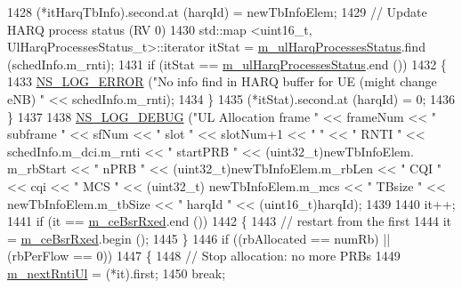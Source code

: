 \begin{DoxyCode}
1428                         (*itHarqTbInfo).second.at (harqId) = newTbInfoElem;
1429                         \textcolor{comment}{// Update HARQ process status (RV 0)}
1430                         std::map <uint16\_t, UlHarqProcessesStatus\_t>::iterator itStat = 
      \hyperlink{classns3_1_1MmWaveRrMacScheduler_af963cfe7e5dc36fce45c16d60b506465}{m\_ulHarqProcessesStatus}.find (schedInfo.m\_rnti);
1431                         \textcolor{keywordflow}{if} (itStat == \hyperlink{classns3_1_1MmWaveRrMacScheduler_af963cfe7e5dc36fce45c16d60b506465}{m\_ulHarqProcessesStatus}.end ())
1432                         \{
1433                                 \hyperlink{group__logging_ga0261a8db1d4ac5f79417d117634fd455}{NS\_LOG\_ERROR} (\textcolor{stringliteral}{"No info find in HARQ buffer for UE (might change
       eNB) "} << schedInfo.m\_rnti);
1434                         \}
1435                         (*itStat).second.at (harqId) = 0;
1436                 \}
1437 
1438                 \hyperlink{group__logging_ga413f1886406d49f59a6a0a89b77b4d0a}{NS\_LOG\_DEBUG} (\textcolor{stringliteral}{"UL Allocation frame "} << frameNum << \textcolor{stringliteral}{" subframe "} << sfNum << \textcolor{stringliteral}{"
       slot "} << slotNum+1 << \textcolor{stringliteral}{" "} << \textcolor{stringliteral}{" RNTI "} << schedInfo.m\_dci.m\_rnti << \textcolor{stringliteral}{" startPRB "} << (uint32\_t)newTbInfoElem.
      m\_rbStart << \textcolor{stringliteral}{" nPRB "} << (uint32\_t)newTbInfoElem.m\_rbLen << \textcolor{stringliteral}{" CQI "} << cqi << \textcolor{stringliteral}{" MCS "} << (uint32\_t)
      newTbInfoElem.m\_mcs << \textcolor{stringliteral}{" TBsize "} << newTbInfoElem.m\_tbSize << \textcolor{stringliteral}{" harqId "} << (uint16\_t)harqId);
1439 
1440                 it++;
1441                 \textcolor{keywordflow}{if} (it == \hyperlink{classns3_1_1MmWaveRrMacScheduler_a2ebec374f1ff5014f115ff8b68ff5ebb}{m\_ceBsrRxed}.end ())
1442                 \{
1443                         \textcolor{comment}{// restart from the first}
1444                         it = \hyperlink{classns3_1_1MmWaveRrMacScheduler_a2ebec374f1ff5014f115ff8b68ff5ebb}{m\_ceBsrRxed}.begin ();
1445                 \}
1446                 \textcolor{keywordflow}{if} ((rbAllocated == numRb) || (rbPerFlow == 0))
1447                 \{
1448                         \textcolor{comment}{// Stop allocation: no more PRBs}
1449                         \hyperlink{classns3_1_1MmWaveRrMacScheduler_ac9c27bbc2f828923b14cbc3b6ed5be57}{m\_nextRntiUl} = (*it).first;
1450                         \textcolor{keywordflow}{break};

\end{DoxyCode}
